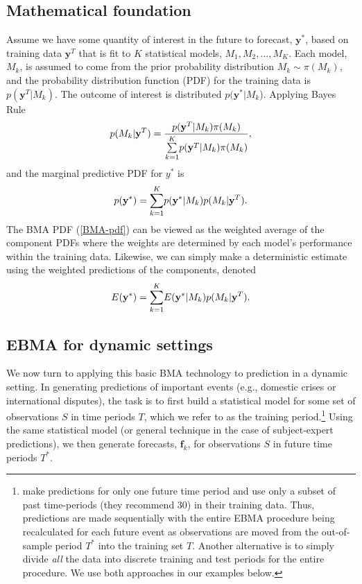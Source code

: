 \documentclass[pdftex,12pt,fullpage,oneside]{amsart}
\begin{document}
\subsection{Mathematical foundation}
Assume we have some quantity of interest in the future to forecast,
$\mathbf{y}^*$, based on training data $\mathbf{y}^T$ that is fit to
$K$ statistical models, $M_1, M_2, \ldots, M_K$. Each model, $M_k$, is
assumed to come from the prior probability distribution $M_k\sim
\pi(M_k)$, and the probability distribution function (PDF) for the
training data is $p(\mathbf{y}^T|M_k)$. The outcome of interest is
distributed $p(\mathbf{y}^*|M_k$).  Applying Bayes Rule
\begin{equation} \small
p(M_k|\mathbf{y}^T) = \frac{p(\mathbf{y}^T|M_k)\pi(M_k)}{\underset{k=1}{\overset{K}{\sum}}p(\mathbf{y}^T|M_k)\pi(M_k)},
\end{equation}
\noindent and the marginal predictive PDF for $y^*$ is
\begin{equation}
\label{BMA-pdf}
\small
p(\mathbf{y}^*) = \underset{k=1}{\overset{K}{\sum}} p(\mathbf{y}^*|M_k)p(M_k|\mathbf{y}^T).
\end{equation}
The BMA PDF (\ref{BMA-pdf}) can be viewed as the weighted average of
the component PDFs where the weights are determined by each model's
performance within the training data.  Likewise, we can simply make a
deterministic estimate using the weighted predictions of the
components, denoted
\begin{equation} \small
E(\mathbf{y}^*) = \underset{k=1}{\overset{K}{\sum}} E(\mathbf{y}^*|M_k)p(M_k|\mathbf{y}^T).
\end{equation}

\subsection{EBMA for dynamic settings}

We now turn to applying this basic BMA technology to prediction in a
dynamic setting.  In generating predictions of important events (e.g.,
domestic crises or international disputes), the task is to first build
a statistical model for some set of observations $S$ in time periods
$T$, which we refer to as the training
period.\footnote{\citet{Sloughter:2007} make predictions for only one
  future time period and use only a subset of past time-periods (they
  recommend 30) in their training data. Thus, predictions are made
  sequentially with the entire EBMA procedure being recalculated for
  each future event as observations are moved from the out-of-sample
  period $T^*$ into the training set $T$. Another alternative is to
  simply divide \textit{all} the data into discrete training and test
  periods for the entire procedure.  We use both approaches in our
  examples below.}  Using the same statistical model (or general
technique in the case of subject-expert predictions), we then generate
forecasts, $\mathbf{f}_k$, for observations $S$ in future time periods
$T^*$.
\end{document}
